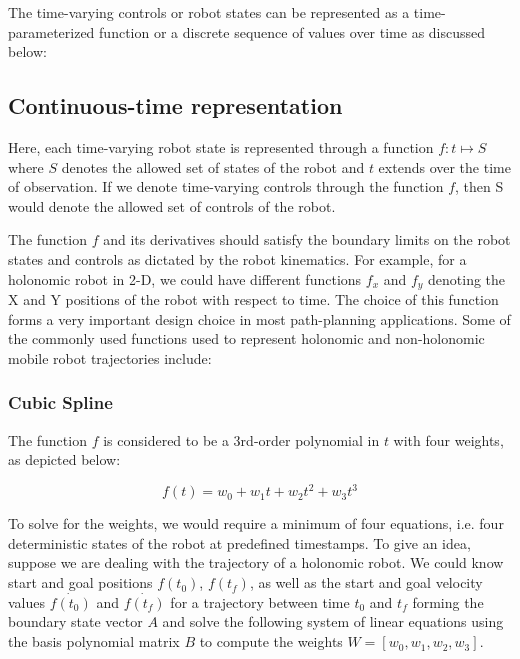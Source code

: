 The time-varying controls or robot states can be represented as a time-parameterized function or a discrete sequence of values over time as discussed below:

\subsection{Continuous-time representation}

Here, each time-varying robot state is represented through a function $f: t\mapsto S$ where $S$ denotes the allowed set of states of the robot and $t$ extends over the time of observation. If we denote time-varying controls through the function $f$, then S would denote the allowed set of controls of the robot.

The function $f$ and its derivatives should satisfy the boundary limits on the robot states and controls as dictated by the robot kinematics. For example, for a holonomic robot in 2-D, we could have different functions $f_x$ and $f_y$ denoting the X and Y positions of the robot with respect to time. The choice of this function forms a very important design choice in most path-planning applications. Some of the commonly used functions used to represent holonomic and non-holonomic mobile robot trajectories include:

\subsubsection{Cubic Spline}

The function $f$ is considered to be a 3rd-order polynomial in $t$ with four weights, as depicted below:

\begin{equation}
f(t) = w_0 + w_1 t + w_2 t^2 + w_3 t^3
\label{eqn:cubic_spline}
\end{equation}

To solve for the weights, we would require a minimum of four equations, i.e. four deterministic states of the robot at predefined timestamps. To give an idea, suppose we are dealing with the trajectory of a holonomic robot. We could know start and goal positions $f(t_0)$, $f(t_f)$, as well as the start and goal velocity values $\dot{f(t_0)}$ and $\dot{f(t_f)}$ for a trajectory between time $t_0$ and $t_f$ forming the boundary state vector $A$ and solve the following system of linear equations using the basis polynomial matrix $B$ to compute the weights $W = [w_0, w_1, w_2, w_3]$.

